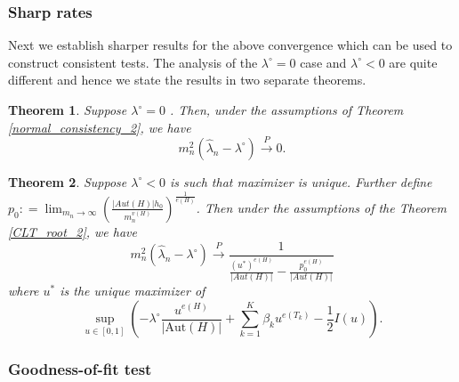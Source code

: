 \documentclass[12pt]{article}
\numberwithin{equation}{section}
\newtheorem{theorem}{Theorem}[section]
\newtheorem{remark}{Remark}[section]
\begin{document}
\subsubsection{Sharp rates}

Next we establish sharper results for the above convergence which can be used to construct consistent tests. The analysis of the $\lambda^{\circ}=0$ case  and $\lambda^{\circ}<0$ are quite different and hence we state the results in two separate theorems.
\begin{theorem}
{\label{CLT_root_2}}
Suppose $\lambda^{\circ} = 0$ . Then, under the assumptions of Theorem \ref{normal_consistency_2}, we have
    $$ m_n^2(\hat{\lambda}_n-\lambda^{\circ})\xrightarrow{P} 0.$$

\end{theorem}


\begin{theorem}{\label{sharp_rates}}
Suppose $\lambda^{\circ}<0$ is such that maximizer is unique. Further define \(p_0: = \lim_{m_n\to\infty}\left(\frac{\lvert Aut(H) \rvert h_0}{m_n^{v(H)}}\right)^{\frac{1}{e(H)}}\). Then under the assumptions of the Theorem \ref{CLT_root_2}, we have
    $$ m_n^2(\hat{\lambda}_n-\lambda^{\circ})\xrightarrow{P} \frac{1}{\frac{(u^*)^{e(H)}}{\lvert Aut(H)\rvert}-\frac{p_0^{e(H)}}{\lvert Aut(H)\rvert}}$$
    where $u^*$ is the unique maximizer of 
\[
\sup_{u\in[0,1]}\left(-\lambda^{\circ} \frac{u^{e(H)}}{\lvert\text{Aut}(H)\rvert} + \sum_{k=1}^K \beta_k u^{e(T_k)} - \frac{1}{2}I(u)\right).
\]



\end{theorem}


\subsubsection{Goodness-of-fit test}
\end{document}
